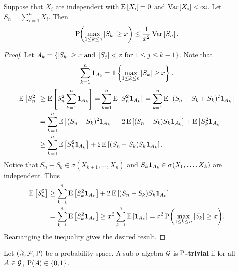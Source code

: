 \begin{theorem}
    Suppose that $X_i$ are independent with $\E\sbrc{X_i} = 0$ and $\Var\sbrc{X_i}<\infty$. 
    Let $S_n = \sum_{i=1}^n X_i$. Then 
    \begin{equation*}
        \P\pth{\max_{1\leq k\leq n}\abs{S_k}\geq x} \leq \frac{1}{x^2}\Var\sbrc{S_n}. 
    \end{equation*}
\end{theorem}
\begin{proof}
    Let $A_k = \set{\abs{S_k}\geq x\text{ and }\abs{S_j}<x\text{ for $1\leq j\leq k-1$}}$. 
    Note that
    \begin{equation*}
        \sum_{k=1}^n\one_{A_k} = \one\set{\max_{1\leq k\leq n}\abs{S_k}\geq x}. 
    \end{equation*} 
    \begin{equation*}
        \begin{split}
            \E\sbrc{S_n^2} &\geq \E\sbrc{S_n^2\sum_{k=1}^n\one_{A_k}} 
            = \sum_{k=1}^n\E\sbrc{S_n^2\one_{A_k}} 
            = \sum_{k=1}^n\E\sbrc{(S_n - S_k + S_k)^2\one_{A_k}} \\
            &= \sum_{k=1}^n \E\sbrc{(S_n-S_k)^2\one_{A_k}} + 2\E\sbrc{(S_n-S_k)S_k\one_{A_k}} + \E\sbrc{S_k^2\one_{A_k}} \\ 
            &\geq \sum_{k=1}^n \E\sbrc{S_k^2\one_{A_k}} + 2\E\sbrc{(S_n-S_k)S_k\one_{A_k}}.
        \end{split}
    \end{equation*}
    Notice that $S_n-S_k\in\sigma(X_{k+1},\ldots,X_n)$ and $S_k\one_{A_k}\in\sigma(X_1,\ldots,X_k)$ 
    are independent. Thus 
    \begin{equation*}
        \begin{split}
            \E\sbrc{S_n^2} &\geq \sum_{k=1}^n \E\sbrc{S_k^2\one_{A_k}} + 2\E\sbrc{(S_n-S_k)S_k\one_{A_k}} \\
            &= \sum_{k=1}^n \E\sbrc{S_k^2\one_{A_k}}\geq x^2\sum_{k=1}^n \E\sbrc{\one_{A_k}}
            = x^2\P\pth{\max_{1\leq k\leq n}\abs{S_k}\geq x}. 
        \end{split} 
    \end{equation*}
    Rearranging the inequality gives the desired result. 
\end{proof}

\begin{definition}
    Let $(\Omega,\F,\P)$ be a probability space. A sub-$\sigma$-algebra $\G$ 
    is \textbf{$\P$-trivial} if for all $A\in\G$, $\P(A)\in\set{0,1}$. 
\end{definition}

